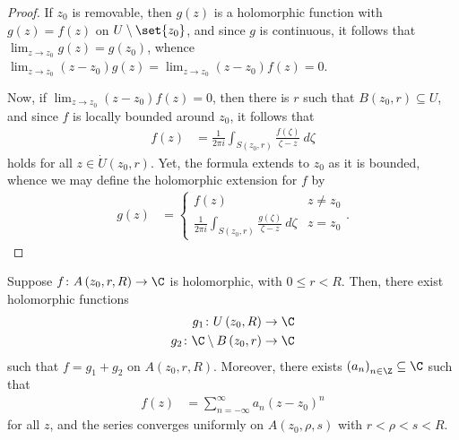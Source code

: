 \documentclass[10pt]{mypackage}
\begin{document}
\begin{proof}
  If $z_0$ is removable, then $g(z)$ is a holomorphic function with $g(z) = f(z)$ on $U\setminus \set{z_0}$, and since $g$ is continuous, it follows that $\lim_{z\rightarrow z_0}g(z) = g\left(z_0\right)$, whence $\lim_{z\rightarrow z_0}\left( z-z_0 \right)g(z) = \lim_{z\rightarrow z_0}\left( z-z_0 \right)f(z) = 0$.\newline

  Now, if $\lim_{z\rightarrow z_0}\left( z-z_0 \right)f(z) = 0$, then there is $r$ such that $B\left( z_0,r \right)\subseteq U$, and since $f$ is locally bounded around $z_0$, it follows that
  \begin{align*}
    f(z) &= \frac{1}{2\pi i} \int_{S\left( z_0,r \right)}^{} \frac{f\left( \zeta \right)}{\zeta - z}\:d\zeta
  \end{align*}
  holds for all $z\in \dot{U}\left( z_0,r \right)$. Yet, the formula extends to $z_0$ as it is bounded, whence we may define the holomorphic extension for $f$ by
  \begin{align*}
    g\left( z \right) &= \begin{cases}
      f(z) & z\neq z_0\\
      \frac{1}{2\pi i} \int_{S\left( z_0,r \right)}^{} \frac{g\left( \zeta \right)}{\zeta - z}\:d\zeta & z= z_0
    \end{cases}.
  \end{align*}
\end{proof}
\begin{proposition}
  Suppose $f\colon A\left( z_0,r,R \right)\rightarrow \C$ is holomorphic, with $0 \leq r < R$. Then, there exist holomorphic functions
  \begin{align*}
    g_1\colon U\left( z_0,R \right)\rightarrow \C\\
    g_2\colon \C\setminus B\left( z_0,r \right)\rightarrow \C
  \end{align*}
  such that $f = g_1 + g_2$ on $A\left( z_0,r,R \right)$. Moreover, there exists $\left( a_n \right)_{n\in\Z}\subseteq \C$ such that
  \begin{align*}
    f(z) &= \sum_{n=-\infty}^{\infty} a_n\left( z-z_0 \right)^{n}
  \end{align*}
  for all $z$, and the series converges uniformly on $A\left( z_0,\rho,s \right)$ with $r < \rho < s < R$.
\end{proposition}
\end{document}
